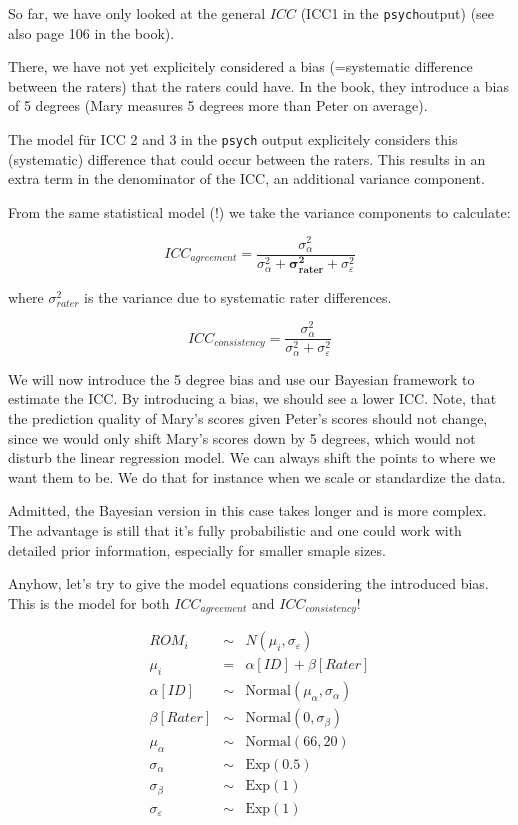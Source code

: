 \documentclass[
]{book}
\begin{document}
So far, we have only looked at the general \textbf{\(ICC\)} (ICC1 in the \texttt{psych}output)
(see also page 106 in the book).

There, we have not yet explicitely considered a bias (=systematic difference
between the raters) that the raters could have. In the book,
they introduce a bias of 5 degrees (Mary measures 5 degrees more than Peter on average).

The model für ICC 2 and 3 in the \texttt{psych} output explicitely considers this
(systematic) difference that could occur between the raters.
This results in an extra term in the denominator
of the ICC, an additional variance component.

From the same statistical model (!) we take the variance components to calculate:

\[ICC_{agreement} = \frac{\sigma_{\alpha}^2}{\sigma_{\alpha}^2 + \mathbf{\sigma_{rater}^2} + \sigma_{\varepsilon}^2}\]

where \(\sigma_{rater}^2\) is the variance due to systematic rater differences.

\[ICC_{consistency} = \frac{\sigma_{\alpha}^2}{\sigma_{\alpha}^2 + \sigma_{\varepsilon}^2}\]

We will now introduce the 5 degree bias and use our Bayesian
framework to estimate the ICC.
By introducing a bias, we should see
a lower ICC. Note, that the prediction quality of Mary's scores
given Peter's scores should not change, since we would only shift Mary's scores
down by 5 degrees, which would not disturb the linear regression model. We can
always shift the points to where we want them to be. We do that for instance
when we scale or standardize the data.

Admitted, the Bayesian version in this case takes longer and is more complex.
The advantage is still that it's fully probabilistic and one could work with
detailed prior information, especially for smaller smaple sizes.

Anyhow, let's try to give the model equations considering
the introduced bias. This is the model for both
\(ICC_{agreement}\) and \(ICC_{consistency}\)!

\[
\begin{array}{rcl}
ROM_i &\sim& N(\mu_i, \sigma_{\varepsilon}) \\
\mu_i &=& \alpha[ID] + \beta[Rater] \\
\alpha[ID] &\sim& \text{Normal}(\mu_{\alpha}, \sigma_{\alpha}) \\
\beta[Rater] &\sim& \text{Normal}(0, \sigma_{\beta}) \\
\mu_{\alpha} &\sim& \text{Normal}(66, 20) \\
\sigma_{\alpha} &\sim& \text{Exp}(0.5) \\
\sigma_{\beta} &\sim& \text{Exp}(1) \\
\sigma_{\varepsilon} &\sim& \text{Exp}(1)
\end{array}
\]
\end{document}
